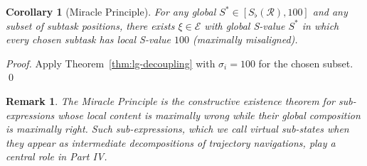 \documentclass[twocolumn,a4paper]{article}
\newtheorem{corollary}[theorem]{Corollary}
\newtheorem{remark}[theorem]{Remark}
\newcommand{\Expr}{\mathcal{E}}
\newcommand{\receiver}{\mathcal{R}}
\newcommand{\Sscalar}{S}
\newcommand{\Sfloor}{S_{\flat}}
\begin{document}
\begin{corollary}[Miracle Principle]
\label{cor:miracle}
For any global $\Sscalar^{*}\in[\Sfloor(\receiver),100]$ and any subset of subtask positions, there exists $\xi\in\Expr$ with global S-value $\Sscalar^{*}$ in which every chosen subtask has local S-value $100$ (maximally misaligned).
\end{corollary}

\begin{proof}
Apply Theorem~\ref{thm:lg-decoupling} with $\sigma_{i}=100$ for the chosen subset. \qed
\end{proof}

\begin{remark}
The Miracle Principle is the constructive existence theorem for sub-expressions whose local content is maximally wrong while their global composition is maximally right. Such sub-expressions, which we call \emph{virtual sub-states} when they appear as intermediate decompositions of trajectory navigations, play a central role in Part IV.
\end{remark}
\end{document}
